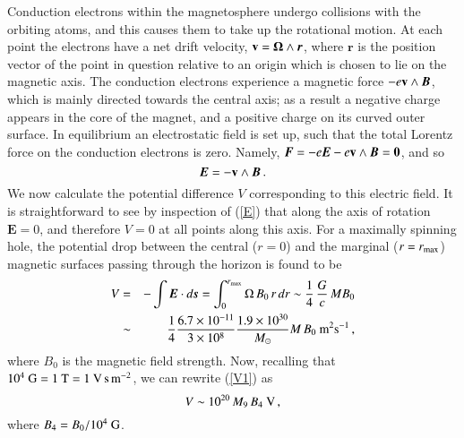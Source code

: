 \documentclass[aps,prd,twocolumn,superscriptaddress,tightenlines,nofootinbib]{revtex4-1}
\begin{document}
Conduction electrons within the magnetosphere undergo collisions with
the orbiting atoms, and this causes them to take up the rotational
motion. At each point the electrons have a net drift velocity, ${\bf
  v} = \bm{\Omega} \wedge \bm{r}$, where $\bm{r}$ is the position
vector of the point in question relative to an origin which is chosen
to lie on the magnetic axis. The conduction electrons experience a
magnetic force $-e {\bf v} \wedge \bm{B}$, which is mainly directed
towards the central axis; as a result a negative charge appears in the
core of the magnet, and a positive charge on its curved outer
surface. In equilibrium an electrostatic field is set up, such that
the total Lorentz force on the conduction electrons is zero. Namely,
$\bm{F} = - e \bm{ E} - e {\bf v} \wedge \bm{ B} = \bm{ 0}$, and so
\begin{equation}
\bm{ E }= - {\bf v} \wedge \bm{ B} \, . 
\label{E}
\end{equation}
We now calculate the potential difference $V$ corresponding to this
electric field. It is straightforward to see by inspection of
(\ref{E}) that along the axis of rotation $\bm{E} = 0$, and therefore $V =
0$ at all points along this axis. For a maximally spinning
hole, the potential drop between the central ($r = 0$) and the
marginal ($r = r_{\rm max}$) magnetic surfaces passing through the
horizon is found to be
\begin{eqnarray}
V  & = & - \int \bm{E} \cdot d \bm{s} = \int_0^{r_{\rm max}} \Omega \, B_0 \,
r \, dr
  \sim \frac{1}{4} \, \frac{G}{c} \, MB_0  \nonumber \\
& \sim & \frac{1}{4} \frac{6.7 \times 10^{-11} }{3
  \times 10^8} \frac{1.9 \times 10^{30}}{M_\odot} M \, B_0~{\rm m^2 s^{-1}} \,,
\label{V1}
\end{eqnarray}
where $B_0$ is the magnetic field strength.
Now, recalling that $10^4~{\rm G}
=1~{\rm T}= 1~{\rm V\, s \, m^{-2}}$, we can rewrite (\ref{V1}) as
\begin{equation}
V \sim 10^{20} \, M_9  \, B_4~{\rm V} \, ,
\label{V2}
\end{equation}
where $B_4 = B_0/10^4~{\rm G}$.
\end{document}
